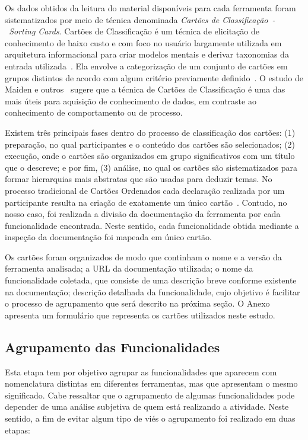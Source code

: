 Os dados obtidos da leitura do material disponíveis para cada ferramenta foram
sistematizados por meio de técnica denominada \textit{Cartões de
	Classificação~-~Sorting Cards}. Cartões de Classificação é um técnica de
elicitação de conhecimento de baixo custo e com foco no usuário largamente
utilizada em arquitetura informacional para criar modelos mentais e derivar
taxonomias da entrada utilizada~\cite{just2008towards}. Ela envolve a
categorização de um conjunto de cartões em grupos distintos de acordo com algum
critério previamente definido~\cite{mcgee2009software}. O estudo de Maiden e
outros~\cite{maiden1996acre} sugere que a técnica de Cartões de Classificação é
uma das mais úteis para aquisição de conhecimento de dados, em contraste ao
conhecimento de comportamento ou de processo.

Existem três principais fases dentro do processo de classificação dos cartões:
(1) preparação, no qual participantes e o conteúdo dos cartões são selecionados;
(2) execução, onde o cartões são organizados em grupo significativos com um
título que o descreve; e por fim, (3) análise, no qual os cartões são
sistematizados para formar hierarquias mais abstratas que são usadas para
deduzir temas. No processo tradicional de Cartões Ordenados cada declaração
realizada por um participante resulta na criação de exatamente um único
cartão~\cite{just2008towards}. Contudo, no nosso caso, foi realizada a divisão
da documentação da ferramenta por cada funcionalidade encontrada. Neste sentido,
cada funcionalidade obtida mediante a inspeção da documentação foi mapeada em
único cartão.

Os cartões foram organizados de modo que continham o nome e a versão da
ferramenta analisada; a URL da documentação utilizada; o nome da funcionalidade
coletada, que consiste de uma descrição breve conforme existente na
documentação; descrição detalhada da funcionalidade, cujo objetivo é facilitar o
processo de agrupamento que será descrito na próxima seção. O Anexo apresenta um
formulário que representa os cartões utilizados neste estudo.

\subsection{Agrupamento das Funcionalidades}
\label{subsec:agrupamento_fucionalidades}

Esta etapa tem por objetivo agrupar as funcionalidades que aparecem com
nomenclatura distintas em diferentes ferramentas, mas que apresentam o mesmo
significado. Cabe ressaltar que o agrupamento de algumas funcionalidades pode
depender de uma análise subjetiva de quem está realizando a atividade. Neste
sentido, a fim de evitar algum tipo de viés o agrupamento foi realizado em duas
etapas:

